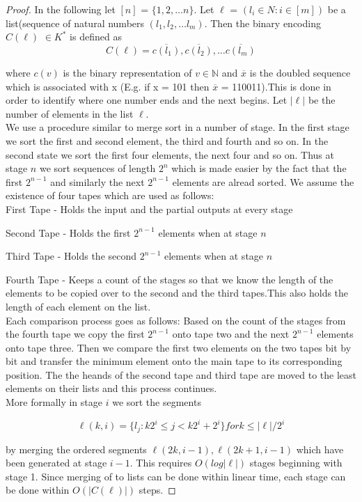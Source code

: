 \documentclass[english]{article}
\theoremstyle{plain}
\theoremstyle{definition}
\theoremstyle{plain}
\begin{document}
\begin{proof}
  In the following let $[n]$ = $\{1,2,\ldots n\}$. Let $\ell$ = $(l_i
  \in N: i \in [m])$ be a list(sequence of natural numbers $(l_1,l_2,
  \ldots l_m)$. Then the binary encoding $C(\ell)$ $\in K^*$ is
  defined as
\[
C(\ell) = \overline{c(l_1)},\overline{c(l_2)}, \ldots \overline{c(l_m)}
\]

  where $c(v)$ is the binary representation of $v \in \mathbb{N}$ and
  $\overline{x}$ is the doubled sequence which is associated with x
  (E.g. if x = 101 then $\overline{x}$ = 110011).This is done in order
  to identify where one number ends and the next begins. Let $|\ell|$
  be the number of elements in the list $\ell$.\\

  We use a procedure similar to merge sort in a number of stage. In
  the first stage we sort the first and second element, the third and
  fourth and so on. In the second state we sort the first four
  elements, the next four and so on. Thus at stage $n$ we sort
  sequences of length $2^n$ which is made easier by the fact that the
  first $2^{n-1}$ and similarly the next $2^{n-1}$ elements are alread
  sorted. We assume the existence of four tapes which are used as
  follows:\\

  First Tape - Holds the input and the partial outputs at every stage

  Second Tape - Holds the first $2^{n-1}$ elements when at stage $n$

  Third Tape - Holds the second $2^{n-1}$ elements when at stage $n$

  Fourth Tape - Keeps a count of the stages so that we know the length
  of the elements to be copied over to the second and the third
  tapes.This also holds the length of each element on the list.\\

  Each comparison process goes as follows: Based on the count of the
  stages from the fourth tape we copy the first $2^{n-1}$ onto tape
  two and the next $2^{n-1}$ elements onto tape three. Then we compare
  the first two elements on the two tapes bit by bit and transfer the
  minimum element onto the main tape to its corresponding
  position. The the heands of the second tape and third tape are moved
  to the least elements on their lists and this process continues.\\

  More formally in stage $i$ we sort the segments

\[
\ell(k,i) = \{l_j: k2^i \leq j < k2^i + 2^i\} for k \leq |\ell|/2^i
\]

  by merging the ordered segments $\ell(2k,i - 1),\ell(2k + 1,i - 1)$
  which have been generated at stage $i - 1$. This requires $O(log
  |\ell|)$ stages beginning with stage 1. Since merging of to lists
  can be done within linear time, each stage can be done within
  $O(|C(\ell)|)$ steps.
\end{proof}
\end{document}
